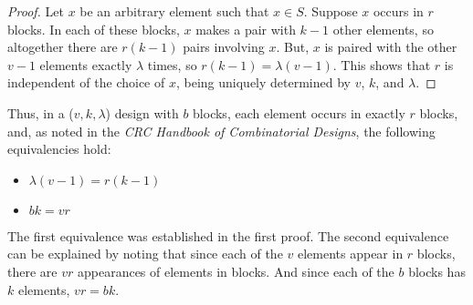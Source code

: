 \documentclass[12pt]{article}
\theoremstyle{definition}
\begin{document}
\begin{proof}\label{pf1}
Let $x$ be an arbitrary element such that $x \in S$. Suppose $x$ occurs in $r$ blocks. In each of these blocks, $x$ makes a pair with $k-1$ other elements, so altogether there are $r(k-1)$ pairs involving $x$. But, $x$ is paired with the other $v-1$ elements exactly $\lambda$ times, so $r(k-1) = \lambda(v-1)$. This shows that $r$ is independent of the choice of $x$, being uniquely determined by $v$, $k$, and $\lambda$. 
\end{proof}
Thus, in a ($v, k, \lambda$) design with $b$ blocks, each element occurs in exactly $r$ blocks, and, as noted in the \textit{CRC Handbook of Combinatorial Designs}\cite{Colbourn}, the following equivalencies hold:
\begin{center}
\begin{itemize}
\item $\lambda(v-1) = r(k-1)$
\item $bk = vr$
\end{itemize}
\end{center}

The first equivalence was established in the first proof. The second equivalence can be explained by noting that since each of the $v$ elements appear in $r$ blocks, there are $vr$ appearances of elements in blocks. And since each of the $b$ blocks has $k$ elements, $vr = bk$.
\end{document}
